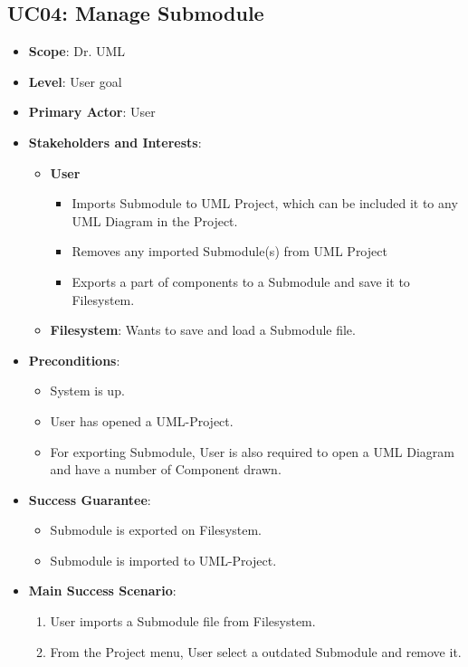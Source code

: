 \documentclass[12pt]{article}
\begin{document}
\subsection{UC04: Manage Submodule}
\begin{itemize}
    \item \textbf{Scope}: Dr. UML
    \item \textbf{Level}: User goal
    \item \textbf{Primary Actor}: User
    \item \textbf{Stakeholders and Interests}:
    \begin{itemize}
        \item \textbf{User}
			\begin{itemize}
				\item { Imports Submodule to UML Project, which can be included it to any UML Diagram in the Project. }
				\item { Removes any imported Submodule(s) from UML Project }
				\item { Exports a part of components to a Submodule and save it to Filesystem. }
			\end{itemize}
        \item \textbf{Filesystem}: Wants to save and load a Submodule file.
    \end{itemize}
    \item \textbf{Preconditions}:
    \begin{itemize}
        \item System is up.
        \item User has opened a UML-Project.
		\item For exporting Submodule, User is also required to open a UML Diagram and have a number of Component drawn.
    \end{itemize}
    \item \textbf{Success Guarantee}: 
    \begin{itemize}
        \item Submodule is exported on Filesystem.
        \item Submodule is imported to UML-Project.
    \end{itemize}
    \item \textbf{Main Success Scenario}:
    \begin{enumerate}
        \item User imports a Submodule file from Filesystem.
		\item From the Project menu, User select a outdated Submodule and remove it.

\end{enumerate}
\end{itemize}
\end{document}

